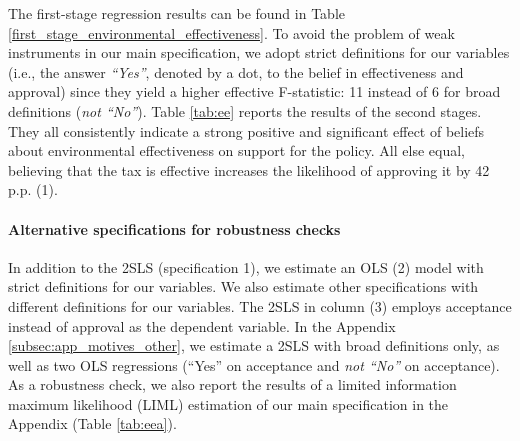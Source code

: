 \documentclass[12pt]{article} %
\begin{document}
The first-stage regression results can be found in Table \ref{first_stage_environmental_effectiveness}. To avoid the problem of weak instruments in our main specification, we adopt strict definitions for our variables (i.e., the answer \textit{``Yes''}, denoted by a dot, to the belief in effectiveness and approval) since they yield a higher effective F-statistic: 11 instead of 6 for broad definitions (\textit{not ``No''}). Table \ref{tab:ee} reports the results of the second stages. They all consistently indicate a strong positive and significant effect of beliefs about environmental effectiveness on support for the policy. All else equal, believing that the tax is effective increases the likelihood of approving it by 42 p.p. (1). 


\paragraph{Alternative specifications for robustness checks}

In addition to the 2SLS (specification 1), we estimate an OLS (2) model with strict definitions for our variables. We also estimate other specifications with different definitions for our variables. The 2SLS in column (3) employs acceptance instead of approval as the dependent variable. In the Appendix \ref{subsec:app_motives_other}, we estimate a 2SLS with broad definitions only, as well as two OLS regressions (``Yes'' on acceptance and \textit{not ``No''} on acceptance). As a robustness check, we also report the results of a limited information maximum likelihood (LIML) estimation of our main specification in the Appendix (Table \ref{tab:eea}).
\end{document}
